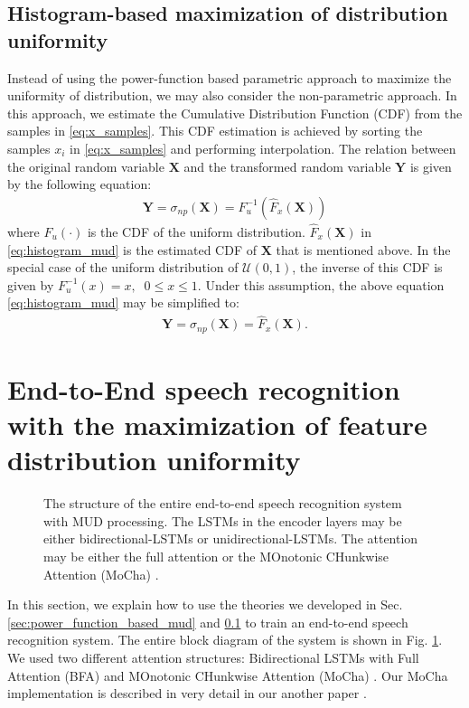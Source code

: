 \documentclass[a4paper]{article}
\begin{document}
\subsection{Histogram-based maximization of distribution uniformity}
\label{sec:histogram_based_mud}
%
Instead of using the power-function based parametric approach to
maximize the uniformity of distribution, we may also consider the
non-parametric approach. In this approach, we estimate the 
Cumulative Distribution Function (CDF) from the samples in 
\eqref{eq:x_samples}. This CDF estimation is achieved by 
sorting the samples $x_i$ in \eqref{eq:x_samples} and performing
interpolation. The relation between the original random variable
$\mathbf{X}$ and the transformed random variable $\mathbf{Y}$
is given by the following equation:
\begin{align}
  \mathbf{Y} = \sigma_{np}(\mathbf{X}) 
      = F_u^{-1} \left(\hat{F}_x(\mathbf{X})\right)
  \label{eq:histogram_mud}
\end{align}
where $F_u(\cdot)$ is the CDF of the uniform distribution.
$\hat{F}_x(\mathbf{X})$ in \eqref{eq:histogram_mud} is the 
estimated CDF of $\mathbf{X}$ that is mentioned above.
In the special case of the uniform distribution of 
$\mathcal{U}(0, 1)$, the inverse of this CDF 
is given by  $F_u^{-1}(x) = x, \;\; 0 \le x \le 1$. Under this
assumption, the above equation \eqref{eq:histogram_mud} may be 
simplified to:
\begin{align}
  \mathbf{Y} = \sigma_{np}(\mathbf{X}) 
      = \hat{F}_x(\mathbf{X}).
  \label{eq:histogram_mud_simple}
\end{align}

\section{End-to-End speech recognition with the maximization of feature 
distribution uniformity}
\label{sec:end_to_end_speech_recognition}
%
%
\begin{figure}[tbp]
  \begin{center}
    \resizebox{80mm}{!}{}
      \caption {  The structure of the entire end-to-end 
      speech recognition system with MUD processing. The LSTMs
      in the encoder layers may be either bidirectional-LSTMs or
      unidirectional-LSTMs. The attention may be either the full
      attention or the MOnotonic CHunkwise Attention (MoCha) 
      \cite{c_chiu_iclr_2018_00, k_kim_asru_2019_00}. 
     }   
     \label{fig:entire_diagram}
  \end{center}
\end{figure}
%
%
In this section, we explain how to use  the theories we developed in
Sec. \ref{sec:power_function_based_mud} and \ref{sec:histogram_based_mud}
to train an end-to-end speech recognition system. The entire block diagram
of the system is shown in Fig. \ref{fig:entire_diagram}. 
We used two different attention structures: Bidirectional LSTMs with 
Full Attention (BFA)  \cite {d_bahdanau_iclr_2015_00} and 
MOnotonic CHunkwise Attention (MoCha) 
\cite{c_chiu_iclr_2018_00}. Our MoCha implementation is described
in very detail in our another paper \cite{k_kim_asru_2019_00}.
\end{document}
